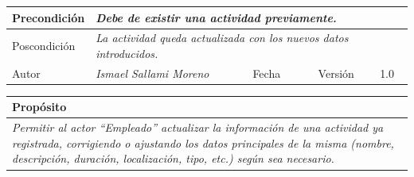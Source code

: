 \begin{table}[H]
\begin{tabular}{llllllll}
        \multicolumn{1}{|l|}{Precondición}                           & \multicolumn{7}{p{10cm}|}{{\color[HTML]{808080} \textit{Debe de existir una actividad previamente.}}}                                                                                                                                                                                                                                   \\ \hline
        \multicolumn{1}{|l|}{Poscondición}                           & \multicolumn{7}{p{10cm}|}{{\color[HTML]{808080} \textit{La actividad queda actualizada con los nuevos datos introducidos.}}}                                                                                                                                                                                                                                                       \\ \hline
        \multicolumn{1}{|l|}{Autor}                                  & \multicolumn{1}{l|}{{\color[HTML]{808080} \textit{Ismael Sallami Moreno}}}                           & \multicolumn{2}{l|}{Fecha}                                                   & \multicolumn{1}{l|}{}                          & \multicolumn{2}{l|}{Versión}                                                      & \multicolumn{1}{l|}{1.0}                                                     \\ \hline
        \end{tabular}
    \end{table}

    \begin{table}[H]
        \begin{tabular}{llllllll}
        \hline
        \multicolumn{8}{|l|}{\cellcolor[HTML]{F2F2F2}Propósito}                                                                                                                                                                                                                                                                                                                                                                                           \\ \hline
        \multicolumn{8}{|p{15cm}|}{{\color[HTML]{808080} \textit{Permitir al actor “Empleado” actualizar la información de una actividad ya registrada, corrigiendo o ajustando los datos principales de la misma (nombre, descripción, duración, localización, tipo, etc.) según sea necesario.}}}                                                                                                                                                                                                             \\ \hline
        \end{tabular}
    \end{table}

